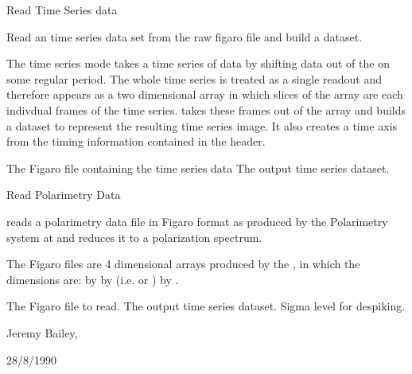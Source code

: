 \begin{manroutinedescription}
        Read {} {} Time Series data

        Read an {} {} time series data set from the raw %
figaro file
        and build a {} {} dataset.

        The {} time series mode takes a time series of data by %
shifting
        data out of the {} on some regular period. The whole time %
series
        is treated as a single readout and therefore appears as a two
        dimensional array in which slices of the array are each indivdual
        frames of the time series. {} takes these frames out of %
the {}
        array and builds a {} {} dataset to represent the %
resulting time
        series image. It also creates a time axis from the timing information
        contained in the {} header.

\begin{manparametertable}
     The Figaro file containing %
the time series data
  The %
output time series dataset.

\end{manparametertable}
\end{manroutinedescription}
\begin{manroutinedescription}
        Read {} Polarimetry Data

        {} reads a polarimetry data file in Figaro format as %
produced
        by the {} Polarimetry system at {} and %
reduces it to
        a {} polarization spectrum.

        The {} Figaro files are 4 dimensional arrays produced by the
        {}, in which the dimensions are: {} {%
} by {}
        {} by {} (i.e. {} or {%
}) by {}.

\begin{manparametertable}
     The {} Figaro %
file to read.
  The %
output time series dataset.
     Sigma level for despiking.

\end{manparametertable}
         Jeremy Bailey, {}

         28/8/1990

\end{manroutinedescription}
